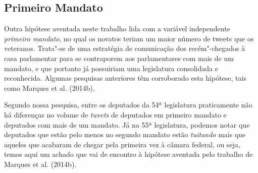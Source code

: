 \subsection{Primeiro Mandato}

Outra hipótese aventada neste trabalho lida com a variável independente
\textit{primeiro mandato}, no qual os novatos teriam um maior número de
tweets que os veteranos. Trata"-se de uma estratégia de comunicação dos
recém"-chegados à casa parlamentar para se contraporem aos parlamentares
com mais de um mandato, e que portanto já possuiriam uma legislatura
consolidada e reconhecida. Algumas pesquisas anteriores têm corroborado
esta hipótese, tais como Marques et al. (2014b).

Segundo nossa pesquisa, entre os deputados da 54ª legislatura
praticamente não há diferenças no volume de \emph{tweets} de deputados
em primeiro mandato e deputados com mais de um mandato. Já na 55ª
legislatura, podemos notar que deputados que estão pelo menos no segundo
mandato estão \emph{tuitando} mais que aqueles que acabaram de chegar
pela primeira vez à câmara federal, ou seja, temos aqui um achado que
vai de encontro à hipótese aventada pelo trabalho de Marques et al.
(2014b).

